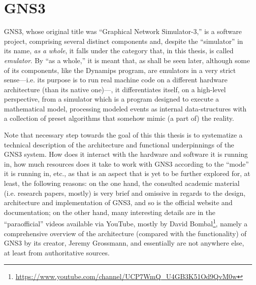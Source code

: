 
\chapter{GNS3}
\label{ch:gns3}

GNS3, whose original title was ``Graphical Network Simulator-3,'' is a software project, comprising several distinct components and, despite the ``simulator'' in its name, \emph{as a whole}, it falls under the category that, in this thesis, is called \emph{emulator}. %
By ``as a whole,'' it is meant that, as shall be seen later, although some of its components, like the Dynamips program, are emulators in a very strict sense---i.e. its purpose is to run real machine code on a different hardware architecture (than its native one)---, it differentiates itself, on a high-level perspective, from a simulator which is a program designed to execute a mathematical model, processing modeled events as internal data-structures with a collection of preset algorithms that somehow mimic (a part of) the reality.

Note that necessary step towards the goal of this this thesis is to systematize a technical description of the architecture and functional underpinnings of the GNS3 system.
How does it interact with the hardware and software it is running in, how much resources does it take to work with GNS3 according to the ``mode'' it is running in, etc., as that is an aspect that is yet to be further explored for, at least, the following reasons:  %
on the one hand, the consulted academic material (i.e. research papers, mostly) is very brief and omissive in regards to the design, architecture and implementation of GNS3, and so is the official website and documentation; on the other hand, many interesting details are in the ``paraofficial'' videos available via YouTube, mostly by David Bombal\footnote{\url{https://www.youtube.com/channel/UCP7WmQ_U4GB3K51Od9QvM0w}}, namely a comprehensive overview of the architecture (compared with the functionality) of GNS3 by its creator, Jeremy Grossmann, and essentially are not anywhere else, at least from authoritative sources. %


